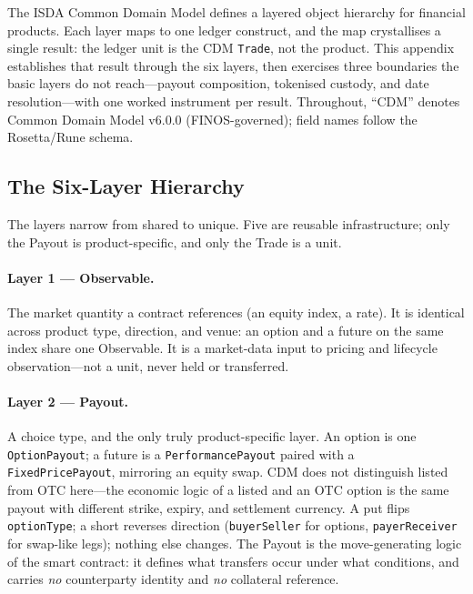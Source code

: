 \documentclass[11pt,a4paper]{article}
\begin{document}
The ISDA Common Domain Model defines a layered object hierarchy for financial products. Each layer maps to one ledger construct, and the map crystallises a single result: the ledger unit is the CDM \texttt{Trade}, not the product. This appendix establishes that result through the six layers, then exercises three boundaries the basic layers do not reach---payout composition, tokenised custody, and date resolution---with one worked instrument per result. Throughout, ``CDM'' denotes Common Domain Model v6.0.0 (FINOS-governed); field names follow the Rosetta/Rune schema.

\subsection{The Six-Layer Hierarchy}
\label{sec:cdm-layers}

The layers narrow from shared to unique. Five are reusable infrastructure; only the Payout is product-specific, and only the Trade is a unit.

\paragraph{Layer 1 --- Observable.} The market quantity a contract references (an equity index, a rate). It is identical across product type, direction, and venue: an option and a future on the same index share one Observable. It is a market-data input to pricing and lifecycle observation---not a unit, never held or transferred.

\paragraph{Layer 2 --- Payout.} A choice type, and the only truly product-specific layer. An option is one \texttt{OptionPayout}; a future is a \texttt{PerformancePayout} paired with a \texttt{FixedPricePayout}, mirroring an equity swap. CDM does not distinguish listed from OTC here---the economic logic of a listed and an OTC option is the same payout with different strike, expiry, and settlement currency. A put flips \texttt{optionType}; a short reverses direction (\texttt{buyerSeller} for options, \texttt{payerReceiver} for swap-like legs); nothing else changes. The Payout is the move-generating logic of the smart contract: it defines what transfers occur under what conditions, and carries \emph{no} counterparty identity and \emph{no} collateral reference.
\end{document}
